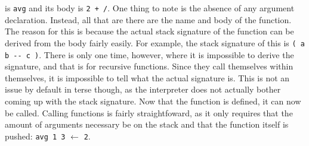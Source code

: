 \documentclass[12pt]{report}
\begin{document}
  is \verb|avg| and its body is \verb|2 + /|.  One thing to note is the absence
  of any argument declaration.  Instead, all that are there are the name and body
  of the function.  The reason for this is because the actual stack signature of
  the function can be derived from the body fairly easily.  For example, the
  stack signature of this is \verb|( a b -- c )|.  There is only one time, however,
  where it is impossible to derive the signature, and that is for recursive functions.
  Since they call themselves within themselves, it is impossible to tell what
  the actual signature is.  This is not an issue by default in terse though, as
  the interpreter does not actually bother coming up with the stack signature.
  \newline\newline
  Now that the function is defined, it can now be called.  Calling functions is fairly
  straightfoward, as it only requires that the amount of arguments necessary be on
  the stack and that the function itself is pushed: 
  \verb|avg 1 3| $\leftarrow$ \verb|2|.
\end{document}
